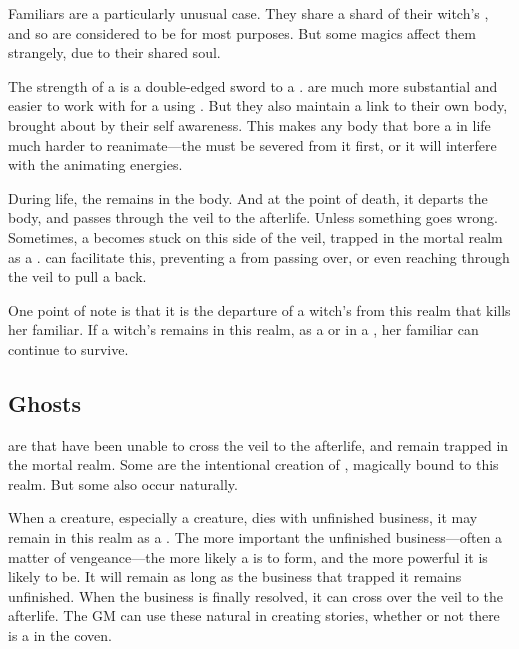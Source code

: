 Familiars are a particularly unusual case.
They share a shard of their witch's {\soul}, and so are considered to be {\strongsouled} for most purposes.
But some magics affect them strangely, due to their shared soul.

The strength of a {\soul} is a double-edged sword to a .
\capital{\strongsouls} are much more substantial and easier to work with for a  using {\ghosts}.
But they also maintain a link to their own body, brought about by their self awareness.
This makes any body that bore a {\strongsoul} in life much harder to reanimate---the {\soul} must be severed from it first, or it will interfere with the animating energies.

During life, the {\soul} remains in the body.
And at the point of death, it departs the body, and passes through the veil to the afterlife.
Unless something goes wrong.
Sometimes, a {\soul} becomes stuck on this side of the veil, trapped in the mortal realm as a {\ghost}.
 can facilitate this, preventing a {\soul} from passing over, or even reaching through the veil to pull a {\soul} back.

One point of note is that it is the departure of a witch's {\soul} from this realm that kills her familiar.
If a witch's {\soul} remains in this realm, as a {\ghost} or in a {\phylactery}, her familiar can continue to survive.

\subsection{Ghosts}

\capital{\ghosts} are {\souls} that have been unable to cross the veil to the afterlife, and remain trapped in the mortal realm.
Some are the intentional creation of , magically bound to this realm.
But some also occur naturally.

When a creature, especially a {\strongsouled} creature, dies with unfinished business, it may remain in this realm as a {\ghost}.
The more important the unfinished business---often a matter of vengeance---the more likely a {\ghost} is to form, and the more powerful it is likely to be.
It will remain as long as the business that trapped it remains unfinished.
When the business is finally resolved, it can cross over the veil to the afterlife.
The GM can use these natural {\ghosts} in creating stories, whether or not there is a  in the coven.

